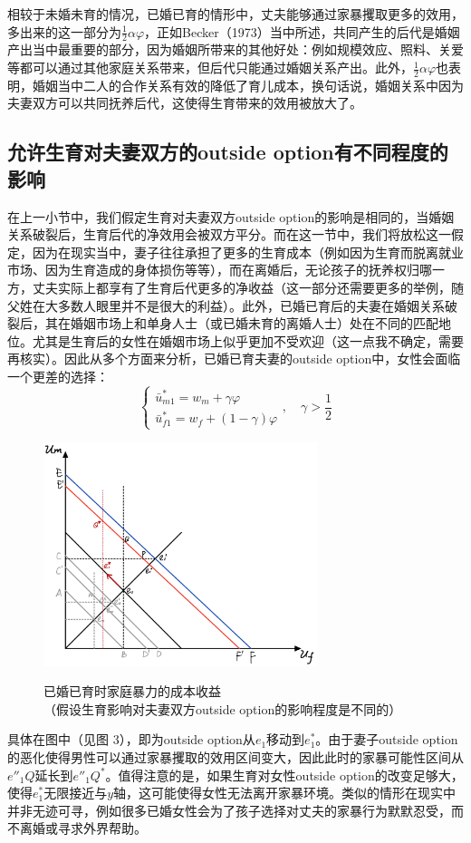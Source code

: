 \documentclass[a4paper,zihao=-4,UTF8]{ctexart}
\begin{document}
相较于未婚未育的情况，已婚已育的情形中，丈夫能够通过家暴攫取更多的效用，多出来的这一部分为$\frac{1}{2}\alpha \varphi$，正如Becker（1973）当中所述，共同产生的后代是婚姻产出当中最重要的部分，因为婚姻所带来的其他好处：例如规模效应、照料、关爱等都可以通过其他家庭关系带来，但后代只能通过婚姻关系产出。此外，$\frac{1}{2}\alpha \varphi$也表明，婚姻当中二人的合作关系有效的降低了育儿成本，换句话说，婚姻关系中因为夫妻双方可以共同抚养后代，这使得生育带来的效用被放大了。
	
	
	\subsection*{允许生育对夫妻双方的outside option有不同程度的影响}
	在上一小节中，我们假定生育对夫妻双方outside option的影响是相同的，当婚姻关系破裂后，生育后代的净效用会被双方平分。而在这一节中，我们将放松这一假定，因为在现实当中，妻子往往承担了更多的生育成本（例如因为生育而脱离就业市场、因为生育造成的身体损伤等等），而在离婚后，无论孩子的抚养权归哪一方，丈夫实际上都享有了生育后代更多的净收益（这一部分还需要更多的举例，随父姓在大多数人眼里并不是很大的利益）。此外，已婚已育后的夫妻在婚姻关系破裂后，其在婚姻市场上和单身人士（或已婚未育的离婚人士）处在不同的匹配地位。尤其是生育后的女性在婚姻市场上似乎更加不受欢迎（这一点我不确定，需要再核实）。因此从多个方面来分析，已婚已育夫妻的outside option中，女性会面临一个更差的选择：
	\begin{equation}
		\begin{cases}
			\bar{u}_{m1}^* = w_m+\gamma \varphi \\
			\bar{u}_{f1}^* = w_f+(1-\gamma)\varphi
		\end{cases} , \quad \gamma > \frac{1}{2}
	\end{equation}
	
	\begin{figure}[H]
		\centering
		\includegraphics[width=80mm]{pic/figure3.png}
		\caption{\centering}{已婚已育时家庭暴力的成本收益\\（假设生育影响对夫妻双方outside option的影响程度是不同的）}
	\end{figure}
	
	具体在图中（见图 3），即为outside option从$e_1$移动到$e_1^*$。由于妻子outside option的恶化使得男性可以通过家暴攫取的效用区间变大，因此此时的家暴可能性区间从$e''_1Q$延长到$e''_1Q^*$。值得注意的是，如果生育对女性outside option的改变足够大，使得$e_1^*$无限接近与$y$轴，这可能使得女性无法离开家暴环境。类似的情形在现实中并非无迹可寻，例如很多已婚女性会为了孩子选择对丈夫的家暴行为默默忍受，而不离婚或寻求外界帮助。








	
\end{document}
